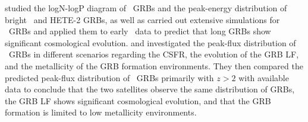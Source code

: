 \cite{Daigne_et_al.-2006-MNRAS} studied the logN-logP diagram of \B\ GRBs and the peak-energy distribution of bright \B\ and HETE-2 GRBs, as well as carried out extensive simulations for \s\ GRBs and applied them to early \s\ data to predict that long GRBs show significant cosmological evolution. \cite{Salvaterra_et_al.-2007-ApJ} and \cite{Salvaterra_et_al.-2009-MNRAS} investigated the peak-flux distribution of \B\ GRBs in different scenarios regarding the CSFR, the evolution of the GRB LF, and the metallicity of the GRB formation environments. They then compared the predicted peak-flux distribution of \s\ GRBs primarily with $z > 2$ with available data to conclude that the two satellites observe the same distribution of GRBs, the GRB LF shows significant cosmological evolution, and that the GRB formation is limited to low metallicity environments.

